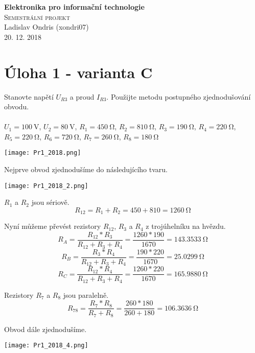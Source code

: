 \documentclass[11pt]{article}
\begin{document}
\begin{titlepage}
\center

\textbf{\Huge{Elektronika pro informační technologie}}
\\[4.0cm]

\textsc{\Huge Semestrální projekt}
\\[1.0cm]
\Large{Ladislav Ondris (xondri07)}
\\[0.7cm]
\Large{20. 12. 2018}


\end{titlepage}

\newpage
\section{Úloha 1 - varianta C}
Stanovte napětí \(U_{R3}\) a proud \(I_{R3}\). Použijte metodu postupného zjednodušování
obvodu.
\\
\\
\(U_1 = \SI{100}{\volt}\),
\(U_2 = \SI{80}{\volt}\),
\(R_1 = \SI{450}{\ohm}\),
\(R_2 = \SI{810}{\ohm}\),
\(R_3 = \SI{190}{\ohm}\),
\(R_4 = \SI{220}{\ohm}\),
\(R_5 = \SI{220}{\ohm}\),
\(R_6 = \SI{720}{\ohm}\),
\(R_7 = \SI{260}{\ohm}\),
\(R_8 = \SI{180}{\ohm}\)

\begin{center}
	\texttt{[image: Pr1\_2018.png]} 
\end{center}

Nejprve obvod zjednodušíme do následujícího tvaru.

\begin{center}
	\texttt{[image: Pr1\_2018\_2.png]} 
\end{center}

\(R_1\) a \(R_2 \) jsou sériově.
\[R_{12} = R_1 + R_2 = 450 + 810 = \SI{1260}{\ohm}\]

Nyní můžeme převést rezistory \(R_{12}\), \(R_3\) a \(R_4\) z trojúhelníku na hvězdu.
\[R_A = \frac{R_{12}*R_3}{R_{12} + R_3 + R_4} = \frac{1260 * 190}{1670} = \SI{143.3533}{\ohm} \]
\[R_B = \frac{R_3*R_4}{R_{12} + R_3 + R_4} = \frac{190 * 220}{1670} = \SI{25.0299}{\ohm} \]
\[R_C = \frac{R_{12}*R_4}{R_{12} + R_3 + R_4} = \frac{1260 * 220}{1670} = \SI{165.9880}{\ohm} \]

Rezistory \(R_7\) a \(R_8 \) jsou paralelně.
\[R_{78} = \frac{R_7*R_8}{R_7 + R_8} = \frac{260 * 180}{260 + 180} = \SI{106.3636}{\ohm} \]

Obvod dále zjednodušíme.

\begin{center}
	\texttt{[image: Pr1\_2018\_4.png]} 
\end{center}
\end{document}
